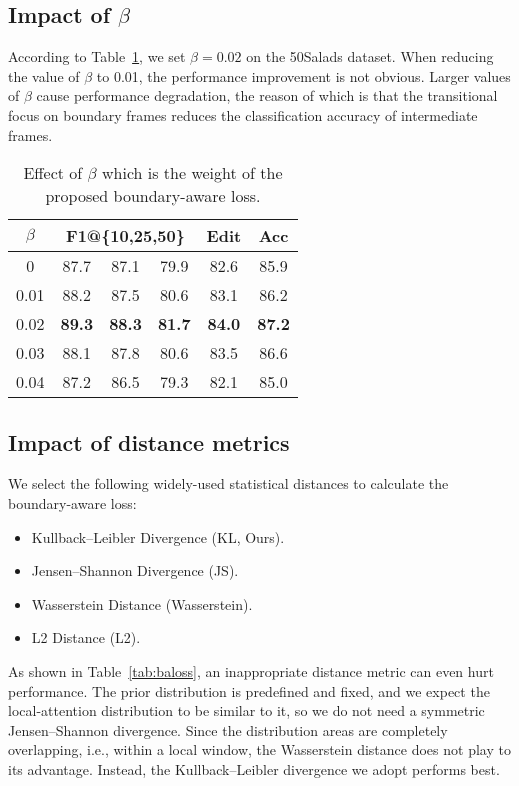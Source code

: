 \documentclass[letterpaper]{article} \usepackage[submission]{aaai23}  \usepackage{times}  \usepackage{helvet}  \usepackage{courier}  \usepackage[hyphens]{url}  \usepackage{graphicx} \urlstyle{rm} \def\UrlFont{\rm}  \usepackage{natbib}  \usepackage{caption} \frenchspacing  \setlength{\pdfpagewidth}{8.5in} \setlength{\pdfpageheight}{11in} \usepackage{algorithm}
\begin{document}
\subsection{Impact of \(\beta\)}
According to Table~\ref{tab:beta}, we set $\beta=0.02$ on the 50Salads dataset. When reducing the value of $\beta$ to 0.01, the performance improvement is not obvious. Larger values of $\beta$ cause performance degradation, the reason of which is that the transitional focus on boundary frames reduces the classification accuracy of intermediate frames.

\begin{table}[ht]
\centering
\begin{tabular}{cccccc}
    \toprule
    $\beta$    & \multicolumn{3}{c}{F1@\{10,25,50\}} & Edit & Acc\\
    \midrule
    0 & 87.7 & 87.1 & 79.9 & 82.6 & 85.9\\
    0.01 & 88.2 & 87.5 & 80.6 & 83.1 & 86.2\\
    0.02 & \textbf{89.3} & \textbf{88.3} & \textbf{81.7} & \textbf{84.0} & \textbf{87.2}\\
    0.03 & 88.1 & 87.8 & 80.6 & 83.5 & 86.6\\
    0.04 & 87.2 & 86.5 & 79.3 & 82.1 & 85.0\\
    \bottomrule
\end{tabular}
\caption{Effect of $\beta$ which is the weight of the proposed boundary-aware loss.}
\label{tab:beta}
\end{table}

\subsection{Impact of distance metrics}
We select the following widely-used statistical distances to calculate the boundary-aware loss:
\begin{itemize}
\item Kullback–Leibler Divergence (KL, Ours).
\item Jensen–Shannon Divergence (JS).
\item Wasserstein Distance (Wasserstein).
\item L2 Distance (L2).
\end{itemize}

As shown in Table~\ref{tab:baloss}, an inappropriate distance metric can even hurt performance. The prior distribution is predefined and fixed, and we expect the local-attention distribution to be similar to it, so we do not need a symmetric Jensen–Shannon divergence. Since the distribution areas are completely overlapping, i.e., within a local window, the Wasserstein distance does not play to its advantage. Instead, the Kullback–Leibler divergence we adopt performs best.
\end{document}
